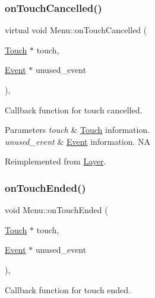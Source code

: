 \subsubsection{\texorpdfstring{on\+Touch\+Cancelled()}{onTouchCancelled()}\hspace{0.1cm}{\footnotesize\ttfamily [2/2]}}
{\footnotesize\ttfamily virtual void Menu\+::on\+Touch\+Cancelled (\begin{DoxyParamCaption}\item[{\hyperlink{classTouch}{Touch} $\ast$}]{touch,  }\item[{\hyperlink{classEvent}{Event} $\ast$}]{unused\+\_\+event }\end{DoxyParamCaption})\hspace{0.3cm}{\ttfamily [override]}, {\ttfamily [virtual]}}

Callback function for touch cancelled.


\begin{DoxyParams}{Parameters}
{\em touch} & \hyperlink{classTouch}{Touch} information. \\
\hline
{\em unused\+\_\+event} & \hyperlink{classEvent}{Event} information.  NA \\
\hline
\end{DoxyParams}


Reimplemented from \hyperlink{classLayer_a9254f82e75c109b81c392d415ecf7b3d}{Layer}.

\mbox{\label{classMenu_a8d9a867ea2dfc4ec2a3309f3df71cc35}} 
\subsubsection{\texorpdfstring{on\+Touch\+Ended()}{onTouchEnded()}\hspace{0.1cm}{\footnotesize\ttfamily [1/2]}}
{\footnotesize\ttfamily void Menu\+::on\+Touch\+Ended (\begin{DoxyParamCaption}\item[{\hyperlink{classTouch}{Touch} $\ast$}]{touch,  }\item[{\hyperlink{classEvent}{Event} $\ast$}]{unused\+\_\+event }\end{DoxyParamCaption})\hspace{0.3cm}{\ttfamily [override]}, {\ttfamily [virtual]}}

Callback function for touch ended.


